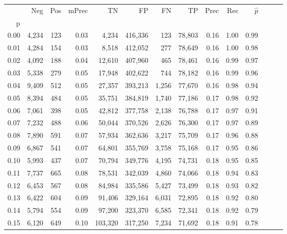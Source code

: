 \begin{tabular}{rrrrrrrrrrrrrr}
\toprule
{} &     Neg &    Pos & mPrec &       TN &       FP &      FN &      TP &  Prec &   Rec & $\hat{p}$ \\
p    &         &        &       &          &          &         &         &       &       &           \\
\midrule
0.00 &   4,234 &    123 &  0.03 &    4,234 &  416,336 &     123 &  78,803 &  0.16 &  1.00 &      0.99 \\
0.01 &   4,284 &    154 &  0.03 &    8,518 &  412,052 &     277 &  78,649 &  0.16 &  1.00 &      0.98 \\
0.02 &   4,092 &    188 &  0.04 &   12,610 &  407,960 &     465 &  78,461 &  0.16 &  0.99 &      0.97 \\
0.03 &   5,338 &    279 &  0.05 &   17,948 &  402,622 &     744 &  78,182 &  0.16 &  0.99 &      0.96 \\
0.04 &   9,409 &    512 &  0.05 &   27,357 &  393,213 &   1,256 &  77,670 &  0.16 &  0.98 &      0.94 \\
0.05 &   8,394 &    484 &  0.05 &   35,751 &  384,819 &   1,740 &  77,186 &  0.17 &  0.98 &      0.92 \\
0.06 &   7,061 &    398 &  0.05 &   42,812 &  377,758 &   2,138 &  76,788 &  0.17 &  0.97 &      0.91 \\
0.07 &   7,232 &    488 &  0.06 &   50,044 &  370,526 &   2,626 &  76,300 &  0.17 &  0.97 &      0.89 \\
0.08 &   7,890 &    591 &  0.07 &   57,934 &  362,636 &   3,217 &  75,709 &  0.17 &  0.96 &      0.88 \\
0.09 &   6,867 &    541 &  0.07 &   64,801 &  355,769 &   3,758 &  75,168 &  0.17 &  0.95 &      0.86 \\
0.10 &   5,993 &    437 &  0.07 &   70,794 &  349,776 &   4,195 &  74,731 &  0.18 &  0.95 &      0.85 \\
0.11 &   7,737 &    665 &  0.08 &   78,531 &  342,039 &   4,860 &  74,066 &  0.18 &  0.94 &      0.83 \\
0.12 &   6,453 &    567 &  0.08 &   84,984 &  335,586 &   5,427 &  73,499 &  0.18 &  0.93 &      0.82 \\
0.13 &   6,422 &    604 &  0.09 &   91,406 &  329,164 &   6,031 &  72,895 &  0.18 &  0.92 &      0.80 \\
0.14 &   5,794 &    554 &  0.09 &   97,200 &  323,370 &   6,585 &  72,341 &  0.18 &  0.92 &      0.79 \\
0.15 &   6,120 &    649 &  0.10 &  103,320 &  317,250 &   7,234 &  71,692 &  0.18 &  0.91 &      0.78 \\

\end{tabular}
